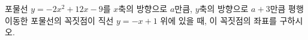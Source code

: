 포물선 $y=-2x^2+12x-9$를 $x$축의 방향으로 $a$만큼, $y$축의 방향으로 $a+3$만큼 평행이동한 포물선의 꼭짓점이 직선 $y=-x+1$ 위에 있을 때, 이 꼭짓점의 좌표를 구하시오.

